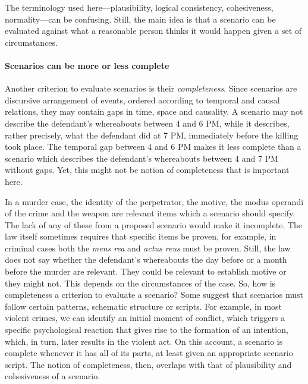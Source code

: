 \documentclass[10pt]{article}
\begin{document}
The terminology used here---plausibility, logical consistency, cohesiveness, normality---can be confusing. 
Still, the main idea is that a scenario can be evaluated against what a reasonable person thinks 
it would happen given a set of circumstances. 






\paragraph{Scenarios can be more or less complete}

Another criterion to evaluate scenarios is their \textit{completeness}. Since scenarios are discursive arrangement of events, ordered according to 
temporal and causal relations, they may contain gaps in time, space and causality. A scenario may not describe the defendant's whereabouts between 4 and 6 PM, 
while it describes, rather precisely, what the defendant did at 7 PM, immediately before the killing took place. The temporal gap between 4 and 6 PM 
makes it less complete than a scenario which describes the defendant's whereabouts between 4 and 7 PM without gaps. 
Yet, this might not be notion of completeness that is important here.  

In a murder case, the identity of the perpetrator, the motive, the 
modus operandi of the crime and the weapon are relevant items which a scenario should specify. 
The lack of any of these from a proposed scenario would make it incomplete. 
The law itself sometimes requires that specific items be proven, 
for example, in criminal cases both the \textit{mens rea} and \textit{actus reus} 
must be proven.   Still, the law does not say whether the defendant's whereabouts the day before or a month before 
the murder are relevant. They could be relevant to establish motive or they might not. 
This depends on the circumstances of the case. So, how is completeness a criterion to evaluate 
a scenario? Some suggest that scenarios must follow certain patterns, 
schematic structure or scripts. For example, in most violent crimes, we can identify an initial 
moment of conflict, which triggers a specific psychological reaction that gives rise to the formation of an 
intention, which, in turn, later results in the violent act. On this account, a scenario is 
complete whenever it has all of its parts, at least given an appropriate scenario script.
The notion of completeness, then, overlaps with 
that of plausibility and cohesiveness of a scenario.
\end{document}
